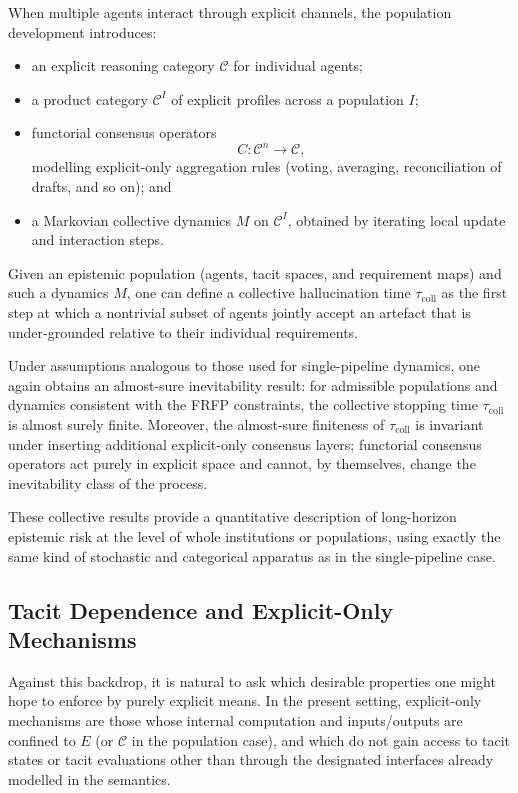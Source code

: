 \documentclass[11pt]{article}
\theoremstyle{definition}
\begin{document}
When multiple agents interact through explicit channels, the population development introduces:
\begin{itemize}
  \item an explicit reasoning category $\mathcal{C}$ for individual agents;
  \item a product category $\mathcal{C}^I$ of explicit profiles across a population $I$;
  \item functorial consensus operators
    \[
      C : \mathcal{C}^n \longrightarrow \mathcal{C},
    \]
    modelling explicit-only aggregation rules (voting, averaging, reconciliation of drafts, and so on); and
  \item a Markovian collective dynamics $M$ on $\mathcal{C}^I$, obtained by iterating local update and interaction steps.
\end{itemize}
Given an epistemic population (agents, tacit spaces, and requirement maps) and such a dynamics $M$, one can define a collective hallucination time $\tau_{\mathrm{coll}}$ as the first step at which a nontrivial subset of agents jointly accept an artefact that is under-grounded relative to their individual requirements.

Under assumptions analogous to those used for single-pipeline dynamics, one again obtains an almost-sure inevitability result: for admissible populations and dynamics consistent with the FRFP constraints, the collective stopping time $\tau_{\mathrm{coll}}$ is almost surely finite. Moreover, the almost-sure finiteness of $\tau_{\mathrm{coll}}$ is invariant under inserting additional explicit-only consensus layers; functorial consensus operators act purely in explicit space and cannot, by themselves, change the inevitability class of the process.

These collective results provide a quantitative description of long-horizon epistemic risk at the level of whole institutions or populations, using exactly the same kind of stochastic and categorical apparatus as in the single-pipeline case.

\subsection{Tacit Dependence and Explicit-Only Mechanisms}

Against this backdrop, it is natural to ask which desirable properties one might hope to enforce by purely explicit means. In the present setting, explicit-only mechanisms are those whose internal computation and inputs/outputs are confined to $E$ (or $\mathcal{C}$ in the population case), and which do not gain access to tacit states or tacit evaluations other than through the designated interfaces already modelled in the semantics.
\end{document}
